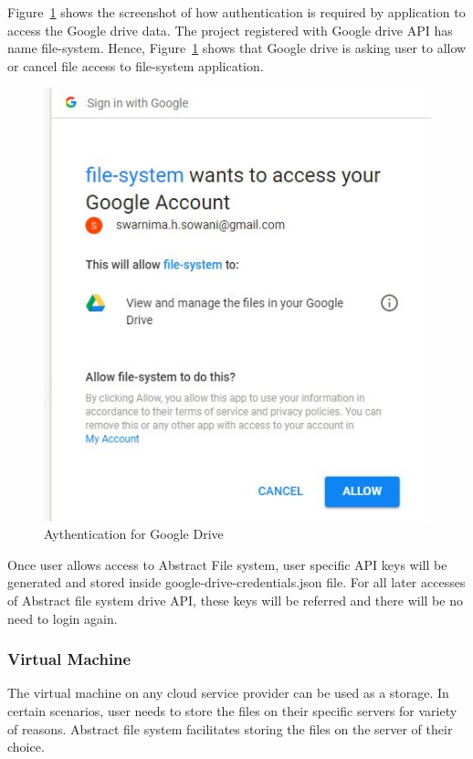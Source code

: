 Figure~\ref{fig:auth} shows the screenshot of how authentication is 
required by application to access the Google drive data. 
The project registered with Google drive API has name file-system. 
Hence, Figure~\ref{fig:auth} shows that Google drive is asking user 
to allow or cancel file access to file-system application. 

\begin{figure}[!ht]
        \centering\includegraphics[width=\columnwidth]
        {image/auth.JPG}
        \caption{Aythentication for Google Drive}\label{fig:auth}
\end{figure}


Once user allows access to Abstract File system, user specific API
keys will be generated and stored inside google-drive-credentials.json
file.  For all later accesses of Abstract file system drive API, these
keys will be referred and there will be no need to login again.


\subsubsection{Virtual Machine}


The virtual machine on any cloud service provider can be used as a
storage. In certain scenarios, user needs to store the files on their
specific servers for variety of reasons. Abstract file system
facilitates storing the files on the server of their choice.

